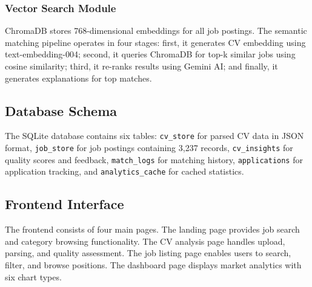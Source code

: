 \documentclass[conference]{IEEEtran}
\begin{document}
\subsubsection{Vector Search Module}
ChromaDB stores 768-dimensional embeddings for all job postings. The semantic matching pipeline operates in four stages: first, it generates CV embedding using text-embedding-004; second, it queries ChromaDB for top-k similar jobs using cosine similarity; third, it re-ranks results using Gemini AI; and finally, it generates explanations for top matches.

\subsection{Database Schema}

The SQLite database contains six tables: \texttt{cv\_store} for parsed CV data in JSON format, \texttt{job\_store} for job postings containing 3,237 records, \texttt{cv\_insights} for quality scores and feedback, \texttt{match\_logs} for matching history, \texttt{applications} for application tracking, and \texttt{analytics\_cache} for cached statistics.

\subsection{Frontend Interface}

The frontend consists of four main pages. The landing page provides job search and category browsing functionality. The CV analysis page handles upload, parsing, and quality assessment. The job listing page enables users to search, filter, and browse positions. The dashboard page displays market analytics with six chart types.
\end{document}
